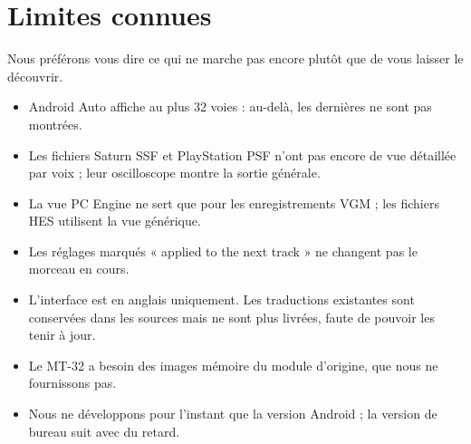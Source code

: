 \chapter{Limites connues}
Nous préférons vous dire ce qui ne marche pas encore plutôt que de vous laisser le découvrir.
\begin{itemize}
  \item Android Auto affiche au plus 32 voies : au-delà, les dernières ne sont pas montrées.
  \item Les fichiers Saturn SSF et PlayStation PSF n'ont pas encore de vue détaillée par voix ; leur oscilloscope
        montre la sortie générale.
  \item La vue PC Engine ne sert que pour les enregistrements VGM ; les fichiers HES utilisent la vue générique.
  \item Les réglages marqués « applied to the next track » ne changent pas le morceau en cours.
  \item L'interface est en anglais uniquement. Les traductions existantes sont conservées dans les sources mais ne
        sont plus livrées, faute de pouvoir les tenir à jour.
  \item Le MT-32 a besoin des images mémoire du module d'origine, que nous ne fournissons pas.
  \item Nous ne développons pour l'instant que la version Android ; la version de bureau suit avec du retard.
\end{itemize}
